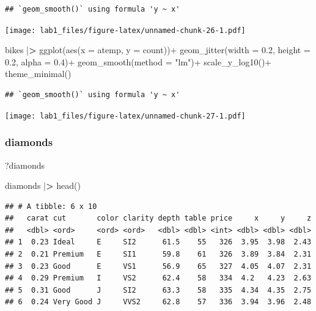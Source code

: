\documentclass[
]{article}
\newenvironment{Shaded}{\begin{snugshade}}{\end{snugshade}}
\newcommand{\AttributeTok}[1]{\textcolor[rgb]{0.77,0.63,0.00}{#1}}
\newcommand{\ErrorTok}[1]{\textcolor[rgb]{0.64,0.00,0.00}{\textbf{#1}}}
\newcommand{\FloatTok}[1]{\textcolor[rgb]{0.00,0.00,0.81}{#1}}
\newcommand{\FunctionTok}[1]{\textcolor[rgb]{0.00,0.00,0.00}{#1}}
\newcommand{\NormalTok}[1]{#1}
\newcommand{\SpecialCharTok}[1]{\textcolor[rgb]{0.00,0.00,0.00}{#1}}
\newcommand{\StringTok}[1]{\textcolor[rgb]{0.31,0.60,0.02}{#1}}
\begin{document}
\begin{verbatim}
## `geom_smooth()` using formula 'y ~ x'
\end{verbatim}

\texttt{[image: lab1\_files/figure-latex/unnamed-chunk-26-1.pdf]}

\begin{Shaded}
\begin{Highlighting}[]
\NormalTok{bikes }\SpecialCharTok{|}\ErrorTok{\textgreater{}} 
  \FunctionTok{ggplot}\NormalTok{(}\FunctionTok{aes}\NormalTok{(}\AttributeTok{x =}\NormalTok{ atemp, }\AttributeTok{y =}\NormalTok{ count))}\SpecialCharTok{+}
  \FunctionTok{geom\_jitter}\NormalTok{(}\AttributeTok{width =} \FloatTok{0.2}\NormalTok{, }\AttributeTok{height =} \FloatTok{0.2}\NormalTok{, }\AttributeTok{alpha =} \FloatTok{0.4}\NormalTok{)}\SpecialCharTok{+}
  \FunctionTok{geom\_smooth}\NormalTok{(}\AttributeTok{method =} \StringTok{"lm"}\NormalTok{)}\SpecialCharTok{+}
  \FunctionTok{scale\_y\_log10}\NormalTok{()}\SpecialCharTok{+}
  \FunctionTok{theme\_minimal}\NormalTok{()}
\end{Highlighting}
\end{Shaded}

\begin{verbatim}
## `geom_smooth()` using formula 'y ~ x'
\end{verbatim}

\texttt{[image: lab1\_files/figure-latex/unnamed-chunk-27-1.pdf]}

\hypertarget{diamonds}{%
\subsubsection{diamonds}\label{diamonds}}

\begin{Shaded}
\begin{Highlighting}[]
\NormalTok{?diamonds}

\NormalTok{diamonds }\SpecialCharTok{|}\ErrorTok{\textgreater{}} 
  \FunctionTok{head}\NormalTok{()}
\end{Highlighting}
\end{Shaded}

\begin{verbatim}
## # A tibble: 6 x 10
##   carat cut       color clarity depth table price     x     y     z
##   <dbl> <ord>     <ord> <ord>   <dbl> <dbl> <int> <dbl> <dbl> <dbl>
## 1  0.23 Ideal     E     SI2      61.5    55   326  3.95  3.98  2.43
## 2  0.21 Premium   E     SI1      59.8    61   326  3.89  3.84  2.31
## 3  0.23 Good      E     VS1      56.9    65   327  4.05  4.07  2.31
## 4  0.29 Premium   I     VS2      62.4    58   334  4.2   4.23  2.63
## 5  0.31 Good      J     SI2      63.3    58   335  4.34  4.35  2.75
## 6  0.24 Very Good J     VVS2     62.8    57   336  3.94  3.96  2.48
\end{verbatim}
\end{document}
